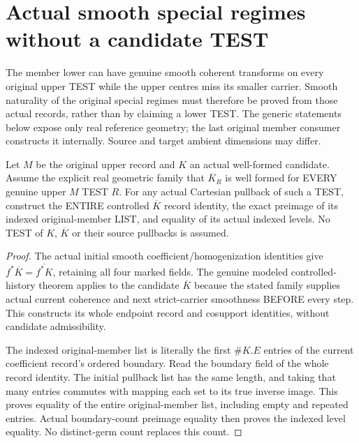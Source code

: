 \section{Actual smooth special regimes without a candidate TEST}

The member lower can have genuine smooth coherent transforms on every
original upper TEST while the upper centres miss its smaller carrier.
Smooth naturality of the original special regimes must therefore be
proved from those actual records, rather than by claiming a lower TEST.
The generic statements below expose only real reference geometry; the
last original member consumer constructs it internally. Source and target
ambient dimensions may differ.

\begin{theorem}
\label{hir:original-untested-modeled-bar-smooth-record-members}
\leanok
Let $M$ be the original upper record and $K$ an actual well-formed
candidate. Assume the explicit real geometric family that
$\overline K_R$ is well formed for EVERY genuine upper $M$ TEST $R$.
For any actual Cartesian pullback of such a TEST, construct the ENTIRE
controlled $\overline K$ record identity, the exact preimage of its
indexed original-member LIST, and equality of its actual indexed levels.
No TEST of $K$, $\overline K$ or their source pullbacks is assumed.
\end{theorem}
\begin{proof}
The actual initial smooth coefficient/homogenization identities give
$f^*\overline K=\overline{f^*K}$, retaining all four marked fields.
The genuine modeled controlled-history theorem applies to the candidate
$\overline K$ because the stated family supplies actual current
coherence and next strict-carrier smoothness BEFORE every step. This
constructs its whole endpoint record and cosupport identities, without
candidate admissibility.

The indexed original-member list is literally the first $\#K.E$ entries
of the current coefficient record's ordered boundary. Read the boundary
field of the whole record identity. The initial pullback list has the
same length, and taking that many entries commutes with mapping each
set to its true inverse image. This proves equality of the entire
original-member list, including empty and repeated entries. Actual
boundary-count preimage equality then proves the indexed level equality.
No distinct-germ count replaces this count.
\end{proof}

